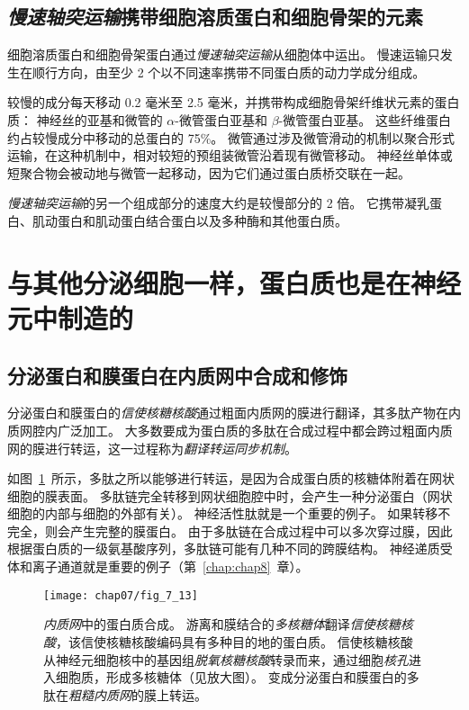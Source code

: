 \subsection{\textit{慢速轴突运输}携带细胞溶质蛋白和细胞骨架的元素}

细胞溶质蛋白和细胞骨架蛋白通过\textit{慢速轴突运输}从细胞体中运出。
慢速运输只发生在顺行方向，由至少 2 个以不同速率携带不同蛋白质的动力学成分组成。


较慢的成分每天移动 0.2 毫米至 2.5 毫米，并携带构成细胞骨架纤维状元素的蛋白质：
神经丝的亚基和微管的 $\alpha$-微管蛋白亚基和 $\beta$-微管蛋白亚基。
这些纤维蛋白约占较慢成分中移动的总蛋白的 75\%。 
微管通过涉及微管滑动的机制以聚合形式运输，在这种机制中，相对较短的预组装微管沿着现有微管移动。
神经丝单体或短聚合物会被动地与微管一起移动，因为它们通过蛋白质桥交联在一起。


\textit{慢速轴突运输}的另一个组成部分的速度大约是较慢部分的 2 倍。
它携带凝乳蛋白、肌动蛋白和肌动蛋白结合蛋白以及多种酶和其他蛋白质。



\section{与其他分泌细胞一样，蛋白质也是在神经元中制造的}

\subsection{分泌蛋白和膜蛋白在内质网中合成和修饰}

分泌蛋白和膜蛋白的\textit{信使核糖核酸}通过粗面内质网的膜进行翻译，其多肽产物在内质网腔内广泛加工。
大多数要成为蛋白质的多肽在合成过程中都会跨过粗面内质网的膜进行转运，这一过程称为\textit{翻译转运同步机制}。


如图~\ref{fig:7_13}~所示，多肽之所以能够进行转运，是因为合成蛋白质的核糖体附着在网状细胞的膜表面。
多肽链完全转移到网状细胞腔中时，会产生一种分泌蛋白（网状细胞的内部与细胞的外部有关）。
神经活性肽就是一个重要的例子。
如果转移不完全，则会产生完整的膜蛋白。
由于多肽链在合成过程中可以多次穿过膜，因此根据蛋白质的一级氨基酸序列，多肽链可能有几种不同的跨膜结构。
神经递质受体和离子通道就是重要的例子（第~\ref{chap:chap8}~章）。


\begin{figure}[htbp]
	\centering
	\texttt{[image: chap07/fig\_7\_13]}
	\caption{\textit{内质网}中的蛋白质合成。
		游离和膜结合的\textit{多核糖体}翻译\textit{信使核糖核酸}，该信使核糖核酸编码具有多种目的地的蛋白质。
		信使核糖核酸从神经元细胞核中的基因组\textit{脱氧核糖核酸}转录而来，通过细胞\textit{核孔}进入细胞质，形成多核糖体（见放大图）。
		变成分泌蛋白和膜蛋白的多肽在\textit{粗糙内质网}的膜上转运。}
	\label{fig:7_13}
\end{figure}


